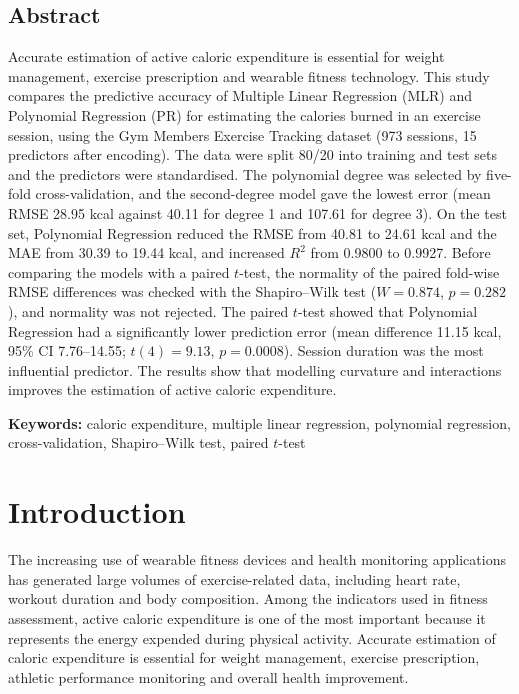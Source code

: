 \documentclass[12pt,a4paper]{report}
\begin{document}
\section*{Abstract}
Accurate estimation of active caloric expenditure is essential for weight management, exercise prescription and wearable fitness technology. This study compares the predictive accuracy of Multiple Linear Regression (MLR) and Polynomial Regression (PR) for estimating the calories burned in an exercise session, using the Gym Members Exercise Tracking dataset (973 sessions, 15 predictors after encoding). The data were split 80/20 into training and test sets and the predictors were standardised. The polynomial degree was selected by five-fold cross-validation, and the second-degree model gave the lowest error (mean RMSE 28.95 kcal against 40.11 for degree 1 and 107.61 for degree 3). On the test set, Polynomial Regression reduced the RMSE from 40.81 to 24.61 kcal and the MAE from 30.39 to 19.44 kcal, and increased $R^2$ from 0.9800 to 0.9927. Before comparing the models with a paired $t$-test, the normality of the paired fold-wise RMSE differences was checked with the Shapiro--Wilk test ($W = 0.874$, $p = 0.282$), and normality was not rejected. The paired $t$-test showed that Polynomial Regression had a significantly lower prediction error (mean difference 11.15 kcal, 95\% CI 7.76--14.55; $t(4) = 9.13$, $p = 0.0008$). Session duration was the most influential predictor. The results show that modelling curvature and interactions improves the estimation of active caloric expenditure.

\vspace{0.3cm}
\noindent\textbf{Keywords:} caloric expenditure, multiple linear regression, polynomial regression, cross-validation, Shapiro--Wilk test, paired $t$-test

\chapter{Introduction}
The increasing use of wearable fitness devices and health monitoring applications has generated large volumes of exercise-related data, including heart rate, workout duration and body composition. Among the indicators used in fitness assessment, active caloric expenditure is one of the most important because it represents the energy expended during physical activity. Accurate estimation of caloric expenditure is essential for weight management, exercise prescription, athletic performance monitoring and overall health improvement.
\end{document}
